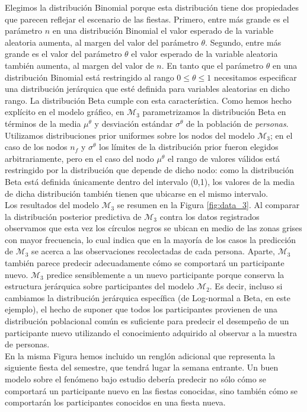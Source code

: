 \documentclass{article}
\begin{document}
\indent Elegimos la distribución Binomial porque esta distribución tiene dos propiedades que parecen reflejar el escenario de las fiestas. Primero, entre más grande es el parámetro $n$ en una distribución Binomial el valor esperado de la variable aleatoria aumenta, al margen del valor del parámetro $\theta$. Segundo, entre más grande es el valor del parámetro $\theta$ el valor esperado de la variable aleatoria también aumenta, al margen del valor de $n$. En tanto que el parámetro $\theta$ en una distribución Binomial está restringido al rango $0\leq\theta\leq1$ necesitamos especificar una distribución jerárquica que esté definida para variables aleatorias en dicho rango. La distribución Beta cumple con esta característica. Como hemos hecho explícito en el modelo gráfico, en $\mathcal M_3$ parametrizamos la distribución Beta en términos de la media $\mu^\theta$ y desviación estándar $\sigma^\theta$ de la población de \emph{personas}. Utilizamos distribuciones prior uniformes sobre los nodos del modelo $\mathcal M_3$; en el caso de los nodos $n_f$ y $\sigma^\theta$ los límites de la distribución prior fueron elegidos arbitrariamente, pero en el caso del nodo $\mu^\theta$ el rango de valores válidos está restringido por la distribución que depende de dicho nodo: como la distribución Beta está definida únicamente dentro del intervalo (0,1), los valores de la media de dicha distribución también tienen que ubicarse en el mismo intervalo.\\ 
\indent Los resultados del modelo $\mathcal M_3$ se resumen en la Figura \ref{fig:data_3}. Al comparar la distribución posterior predictiva de $\mathcal M_3$ contra los datos registrados observamos que esta vez los círculos negros se ubican en medio de las zonas grises con mayor frecuencia, lo cual indica que en la mayoría de los casos la predicción de $\mathcal M_3$ se acerca a las observaciones recolectadas de cada persona. Aparte, $\mathcal M_3$ también parece predecir adecuadamente cómo se comportará un participante nuevo. $\mathcal M_3$ predice sensiblemente a un nuevo participante porque conserva la estructura jerárquica sobre participantes del modelo $\mathcal M_2$. Es decir, incluso si cambiamos la distribución jerárquica específica (de Log-normal a Beta, en este ejemplo), el hecho de suponer que todos los participantes provienen de una distribución poblacional común es suficiente para predecir el desempeño de un participante nuevo utilizando el conocimiento adquirido al observar a la muestra de personas.\\
\indent En la misma Figura hemos incluido un renglón adicional que representa la siguiente fiesta del semestre, que tendrá lugar la semana entrante. Un buen modelo sobre el fenómeno bajo estudio debería predecir no sólo cómo se comportará un participante nuevo en las fiestas conocidas, sino también cómo se comportarán los participantes conocidos en una fiesta nueva.\\
\end{document}
